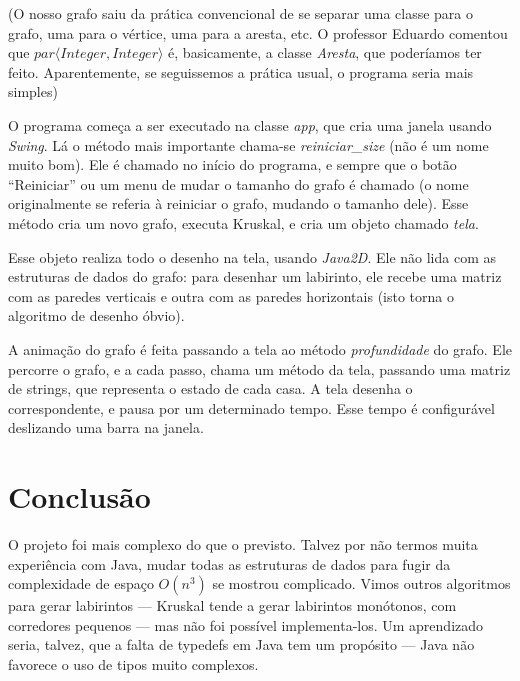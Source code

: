 \documentclass{article}
\begin{document}
(O nosso grafo saiu da prática convencional de se separar uma classe
para o grafo, uma para o vértice, uma para a aresta, etc. O professor
Eduardo comentou que \emph{$par \langle Integer, Integer \rangle$} é,
basicamente, a classe \emph{Aresta}, que poderíamos ter
feito. Aparentemente, se seguissemos a prática usual, o programa seria
mais simples)

O programa começa a ser executado na classe \emph{app}, que cria uma
janela usando \emph{Swing}. Lá o método mais importante chama-se
\emph{reiniciar\_size} (não é um nome muito bom). Ele é chamado no
início do programa, e sempre que o botão ``Reiniciar'' ou um menu de
mudar o tamanho do grafo é chamado (o nome originalmente se referia à
reiniciar o grafo, mudando o tamanho dele). Esse método cria um novo
grafo, executa Kruskal, e cria um objeto chamado \emph{tela}.

Esse objeto realiza todo o desenho na tela, usando \emph{Java2D}. Ele
não lida com as estruturas de dados do grafo: para desenhar um
labirinto, ele recebe uma matriz com as paredes verticais e outra com as
paredes horizontais (isto torna o algoritmo de desenho óbvio).

A animação do grafo é feita passando a tela ao método
\emph{profundidade} do grafo. Ele percorre o grafo, e a cada passo,
chama um método da tela, passando uma matriz de strings, que representa
o estado de cada casa. A tela desenha o correspondente, e pausa por um
determinado tempo. Esse tempo é configurável deslizando uma barra na
janela.

\section*{Conclusão}

O projeto foi mais complexo do que o previsto. Talvez por não termos
muita experiência com Java, mudar todas as estruturas de dados para
fugir da complexidade de espaço \emph{$O(n^3)$} se mostrou
complicado. Vimos outros algoritmos para gerar labirintos --- Kruskal
tende a gerar labirintos monótonos, com corredores pequenos --- mas não
foi possível implementa-los. Um aprendizado seria, talvez, que a falta
de typedefs em Java tem um propósito --- Java não favorece o uso de
tipos muito complexos.
\end{document}
